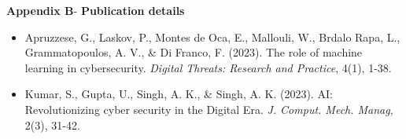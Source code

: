 \begin{center}
	{\Large \textbf{Appendix B}}-\vspace*{0.5 cm}
	{\Large \textbf{Publication details}}
\end{center}
\begin{center}
	\begin{itemize}
		\item Apruzzese, G., Laskov, P., Montes de Oca, E., Mallouli, W., Brdalo Rapa, L., Grammatopoulos, A. V., \& Di Franco, F. (2023). The role of machine learning in cybersecurity. \textit{Digital Threats: Research and Practice}, 4(1), 1-38.
		\item Kumar, S., Gupta, U., Singh, A. K., \& Singh, A. K. (2023). AI: Revolutionizing cyber security in the Digital Era. \textit{J. Comput. Mech. Manag}, 2(3), 31-42.
	\end{itemize}
	
\end{center}
